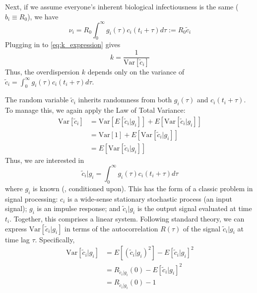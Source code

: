 Next, if we assume everyone's inherent biological infectiousness is the same ($b_i \equiv R_0$), we have 
\begin{equation}
	\nu_i = R_0 \int_0^\infty g_i(\tau) c_i(t_i + \tau) d\tau := R_0 \tilde{c}_i
\end{equation}
Plugging in to \ref{eq:k_expression} gives 
\begin{equation}
	\boxed{k = \frac{1}{\text{Var}[\tilde{c}_i]}}
\end{equation}
Thus, the overdispersion $k$ depends only on the variance of $\tilde{c}_i = \int_0^\infty g_i(\tau) c_i(t_i + \tau) d\tau$. 

 The random variable $\tilde{c}_i$ inherits randomness from both $g_i(\tau)$ and $c_i(t_i+\tau)$. To manage this, we again apply the Law of Total Variance: 
\begin{align}
	\text{Var}[\tilde{c}_i] &= \text{Var}[E[\tilde{c}_i | g_i ]] + E[\text{Var}[\tilde{c}_i | g_i ]] \\ 
	&= \text{Var}[1] + E[\text{Var}[\tilde{c}_i | g_i ]] \\ 
	&= E[\text{Var}[\tilde{c}_i | g_i ]]
\end{align}
Thus, we are interested in 
\begin{equation}
\tilde{c}_i | g_i = \int_0^\infty g_i(\tau) c_i(t_i+\tau) d\tau 
\end{equation}
where $g_i$ is known (\ie, conditioned upon). This has the form of a classic problem in signal processing: $c_i$ is a wide-sense stationary stochastic process (an input signal); $g_i$ is an impulse response; and $\tilde{c}_i | g_i$ is the output signal evaluated at time $t_i$. Together, this comprises a linear system. Following standard theory, we can express $\text{Var}[\tilde{c}_i | g_i]$ in terms of the autocorrelation $R(\tau)$ of the signal $\tilde{c}_i | g_i$ at time lag $\tau$. Specifically, 
\begin{align}
	\text{Var}[\tilde{c}_i | g_i] &= E[(\tilde{c}_i | g_i)^2]  - E[\tilde{c}_i | g_i]^2  \\ 
	&= 	R_{\tilde{c}_i | g_i}(0) - E[\tilde{c}_i | g_i]^2 \\
	&= 	R_{\tilde{c}_i | g_i}(0) - 1 
\end{align}

